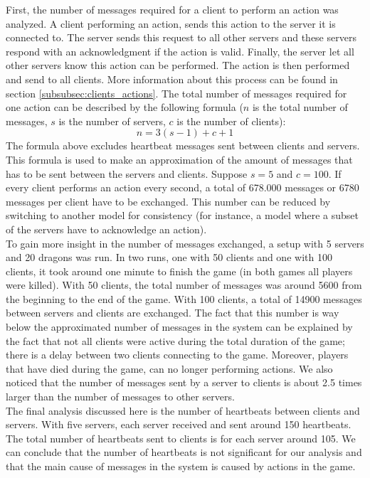		First, the number of messages required for a client to perform an action was analyzed. 
		A client performing an action, sends this action to the server it is connected to. 
		The server sends this request to all other servers and these servers respond with an acknowledgment if the action is valid. 
		Finally, the server let all other servers know this action can be performed. 
		The action is then performed and send to all clients. 
		More information about this process can be found in section \ref{subsubsec:clients_actions}. 
		The total number of messages required for one action can be described by the following formula ($ n $ is the total number of messages, $ s $ is the number of servers, $ c $ is the number of clients):
		$$ n = 3(s - 1) + c + 1 $$
		The formula above excludes heartbeat messages sent between clients and servers.
		This formula is used to make an approximation of the amount of messages that has to be sent between the servers and clients. 
		Suppose $ s = 5 $ and $ c = 100 $. 
		If every client performs an action every second, a total of 678.000 messages or 6780 messages per client have to be exchanged. 
		This number can be reduced by switching to another model for consistency (for instance, a model where a subset of the servers have to acknowledge an action).\\
		To gain more insight in the number of messages exchanged, a setup with 5 servers and 20 dragons was run. 
		In two runs, one with 50 clients and one with 100 clients, it took around one minute to finish the game (in both games all players were killed). 
		With 50 clients, the total number of messages was around 5600 from the beginning to the end of the game. 
		With 100 clients, a total of 14900 messages between servers and clients are exchanged. 
		The fact that this number is way below the approximated number of messages in the system can be explained by the fact that not all clients were active during the total duration of the game; there is a delay between two clients connecting to the game. 
		Moreover, players that have died during the game, can no longer performing actions. We also noticed that the number of messages sent by a server to clients is about 2.5 times larger than the number of messages to other servers.\\
		The final analysis discussed here is the number of heartbeats between clients and servers. 
		With five servers, each server received and sent around 150 heartbeats. 
		The total number of heartbeats sent to clients is for each server around 105. 
		We can conclude that the number of heartbeats is not significant for our analysis and that the main cause of messages in the system is caused by actions in the game.

